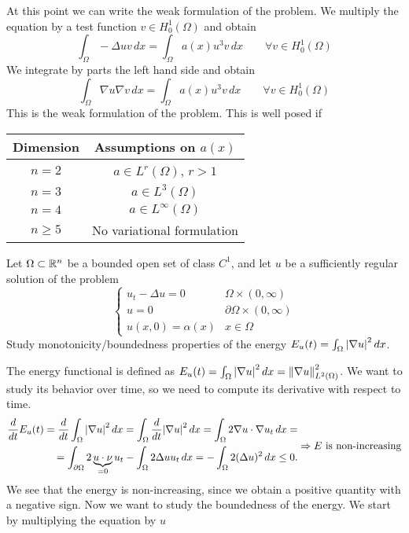 At this point we can write the weak formulation of the problem. We multiply the equation by a test function \(v \in H^1_0(\Omega)\) and obtain 
\[
    \int_\Omega - \Delta u v \, dx = \int_\Omega a(x) u^3 v \, dx \qquad \forall v \in H^1_0(\Omega)
\]
We integrate by parts the left hand side and obtain
\[
    \int_\Omega \nabla u \nabla v \, dx = \int_\Omega a(x) u^3 v \, dx \qquad \forall v \in H^1_0(\Omega)
\]
This is the weak formulation of the problem. This is well posed if 
\begin{table}[h]
    \centering
    \begin{tabular}{|c|c|}
        \hline
        Dimension & Assumptions on $a(x)$ \\
        \hline
        $n = 2$ & $a \in L^r(\Omega)$, $r > 1$ \\
        $n = 3$ & $a \in L^3(\Omega)$ \\
        $n = 4$ & $a \in L^\infty(\Omega)$ \\
        $n \geq 5$ & No variational formulation \\
        \hline
    \end{tabular}
\end{table}
\newpage

\begin{exercise}
    Let \(\Omega \subset \mathbb{R}^n\) be a bounded open set of class \(C^1\), and let \(u\) be a sufficiently regular solution of the problem
    \[
        \begin{cases}
            u_t - \Delta u = 0 & \Omega \times (0, \infty) \\
            u = 0 & \partial\Omega \times (0, \infty) \\
            u(x, 0) = \alpha(x) & x \in \Omega
        \end{cases}
    \]
    Study monotonicity/boundedness properties of the energy \(E_u(t) = \int_\Omega \abs{\nabla u}^2 \, dx\).
\end{exercise}
The energy functional is defined as \(E_u(t) = \int_\Omega \abs{\nabla u}^2 \, dx = \norm{\nabla u}^2_{L^2(\Omega)}\). We want to study its behavior over time, so we need to compute its derivative with respect to time.
\[
    \begin{split}
        \frac{d}{dt} E_u(t) = \frac{d}{dt} \int_\Omega \abs{\nabla u}^2 \, dx = \int_\Omega \frac{d}{dt} \abs{\nabla u}^2 \, dx = \int_\Omega 2 \nabla u \cdot \nabla u_t \, dx = \\
        = \int_{\partial\Omega} 2 \underbrace{u \cdot \nu}_{=0} u_t - \int_\Omega 2 \Delta u u_t \, dx = - \int_\Omega 2 (\Delta u)^2 \, dx \leq 0.
    \end{split}
    \Rightarrow E \text{ is non-increasing}
\]
We see that the energy is non-increasing, since we obtain a positive quantity with a negative sign. Now we want to study the boundedness of the energy. We start by multiplying the equation by \(u\)  

